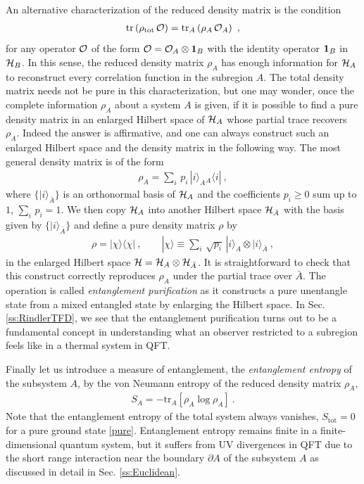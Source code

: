 An alternative characterization of the reduced density matrix is the condition
\begin{align}
	{\rm tr}\left(\rho_\text{tot}\, {\cal O} \right) = {\rm tr}_A\left( \rho_A \,{\cal O}_A\right)\ ,
\end{align}
for any operator ${\cal O}$ of the form ${\cal O} = {\cal O}_A \otimes {\bf 1}_B$ with the identity operator ${\bf 1}_B$ in ${\cal H}_B$.
In this sense, the reduced density matrix $\rho_A$ has enough information for ${\cal H}_A$ to reconstruct every correlation function in the subregion $A$.
The total density matrix needs not be pure in this characterization, but one may wonder, once the complete information $\rho_A$ about a system $A$ is given, if it is possible to find a pure density matrix in an enlarged Hilbert space of ${\cal H}_A$ whose partial trace recovers $\rho_A$.
Indeed the answer is affirmative, and one can always construct such an enlarged Hilbert space and the density matrix in the following way.
The most general density matrix is of the form
\begin{align}
	\rho_A = \sum_i\, p_i\, |i\rangle_A {}_A\langle i | \ ,
\end{align}
where $\{ |i\rangle_{\bar A} \}$ is an orthonormal basis of ${\cal H}_A$ and the coefficients $p_i \ge 0$ sum up to $1$, $\sum_i \,p_i = 1$.
We then copy ${\cal H}_A$ into another Hilbert space ${\cal H}_{\bar A}$ with the basis given by $\{ |i\rangle_{\bar A} \}$ and define a pure density matrix $\rho$ by
\begin{align}\label{Def_Purification}
	\rho = |\chi\rangle \langle \chi| \ , \qquad |\chi\rangle \equiv \sum_{i}\, \sqrt{p_i} \, |i\rangle_A \otimes | i \rangle_{\bar A} \ ,
\end{align}
in the enlarged Hilbert space ${\cal H} = {\cal H}_A\otimes {\cal H}_{\bar A}$.
It is straightforward to check that this construct correctly reproduces $\rho_A$ under the partial trace over $\bar A$.
The operation is called \emph{entanglement purification} as it constructs a pure unentangle state from a mixed entangled state by enlarging the Hilbert space.
In Sec. \ref{ss:RindlerTFD}, we see that the entanglement purification turns out to be a fundamental concept in understanding what an observer restricted to a subregion feels like in a thermal system in QFT.

Finally let us introduce a measure of entanglement, the {\it entanglement entropy} of the subsystem $A$, by the von Neumann entropy of the reduced density matrix $\rho_A$,
\begin{align}\label{EE_def}
S_A =
- \mathrm{tr}_{A}\left[
\rho_{A} \log \rho_{A}\right] \ .
\end{align}
Note that the entanglement entropy of the total system always vanishes, $S_\text{tot} = 0$ for a pure ground state \eqref{pure}. 
Entanglement entropy remains finite in a finite-dimensional quantum system, but it suffers from UV divergences in QFT due to the short range interaction near the boundary $\partial A$ of the subsystem $A$ as discussed in detail in Sec. \ref{ss:Euclidean}.


